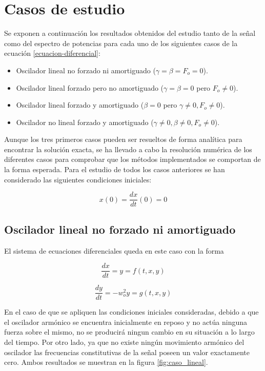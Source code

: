 \documentclass[11pt]{article}
\begin{document}
\section{Casos de estudio}
Se exponen a continuación los resultados obtenidos del estudio tanto de la señal
como del espectro de potencias para cada uno de los siguientes casos de la
ecuación \ref{ecuacion-diferencial}:

\begin{itemize}
\item Oscilador lineal no forzado ni amortiguado ($\gamma = \beta = F_o = 0$).
\item Oscilador lineal forzado pero no amortiguado ($\gamma = \beta = 0$ pero $F_o \neq 0$).
\item Oscilador lineal forzado y amortiguado ($\beta = 0$ pero $\gamma \neq 0, F_o \neq0$).
\item Oscilador no lineal forzado y amortiguado ($\gamma \neq 0, \beta \neq 0, F_o \neq 0$).
\end{itemize}

Aunque los tres primeros casos pueden ser resueltos de forma analítica para
encontrar la solución exacta, se ha llevado a cabo la resolución numérica de los
diferentes casos para comprobar que los métodos implementados se comportan de la
forma esperada. Para el estudio de todos los casos anteriores se han considerado
las siguientes condiciones iniciales: 

\begin{equation}
	x(0) = \frac{dx}{dt}(0) = 0
\end{equation}

\subsection{Oscilador lineal no forzado ni amortiguado}
El sistema de ecuaciones diferenciales queda en este caso con la forma 

\begin{equation}
	\frac{dx}{dt} = y = f(t, x, y)
\end{equation}

\begin{equation}
	\frac{dy}{dt} = -w_o^2 y = g(t, x, y)
\end{equation}

En el caso de que se apliquen las condiciones iniciales consideradas, debido a
que el oscilador armónico se encuentra inicialmente en reposo y no actúa ninguna
fuerza sobre el mismo, no se producirá ningun cambio en su situación a lo largo
del tiempo. Por otro lado, ya que no existe ningún movimiento armónico del
oscilador las frecuencias constitutivas de la señal poseen un valor exactamente
cero. Ambos resultados se muestran en la figura \ref{fig:caso_lineal}.
\end{document}
